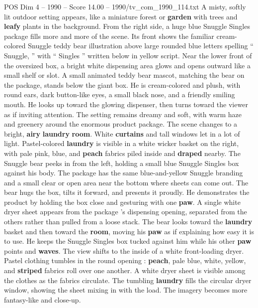 \begin{textsample}{POS Dim 4 – 1990 – Score 14.00 – 1990/tv\_com\_1990\_114.txt}  \label{ex:f4_pos_075}
A misty, softly lit outdoor setting appears, like a miniature forest or \textbf{garden} with trees and \textbf{leafy} plants in the background.
From the right side, a huge blue Snuggle Singles package fills more and more of the scene.
Its front shows the familiar cream-colored Snuggle teddy bear illustration above large rounded blue letters spelling “ Snuggle, ” with “ Singles ” written below in yellow script.
Near the lower front of the oversized box, a bright white dispensing area glows and opens outward like a small shelf or slot.
A small animated teddy bear mascot, matching the bear on the package, stands below the giant box.
He is cream-colored and plush, with round ears, dark button-like eyes, a small black nose, and a friendly smiling mouth.
He looks up toward the glowing dispenser, then turns toward the viewer as if inviting attention.
The setting remains dreamy and soft, with warm haze and greenery around the enormous product package.
The scene changes to a bright, \textbf{airy} \textbf{laundry} \textbf{room}.
White \textbf{curtains} and tall windows let in a lot of light.
Pastel-colored \textbf{laundry} is visible in a white wicker basket on the right, with pale pink, blue, and \textbf{peach} fabrics piled inside and \textbf{draped} nearby.
The Snuggle bear peeks in from the left, holding a small blue Snuggle Singles box against his body.
The package has the same blue-and-yellow Snuggle branding and a small clear or open area near the bottom where sheets can come out.
The bear hugs the box, tilts it forward, and presents it proudly.
He demonstrates the product by holding the box close and gesturing with one \textbf{paw}.
A single white dryer sheet appears from the package ’s dispensing opening, separated from the others rather than pulled from a loose stack.
The bear looks toward the \textbf{laundry} basket and then toward the \textbf{room}, moving his \textbf{paw} as if explaining how easy it is to use.
He keeps the Snuggle Singles box tucked against him while his other \textbf{paw} points and \textbf{waves}.
The view shifts to the inside of a white front-loading dryer.
Pastel clothing tumbles in the round opening : \textbf{peach}, pale blue, white, yellow, and \textbf{striped} fabrics roll over one another.
A white dryer sheet is visible among the clothes as the fabrics circulate.
The tumbling \textbf{laundry} fills the circular dryer window, showing the sheet mixing in with the load.
The imagery becomes more fantasy-like and close-up.

\end{textsample}
